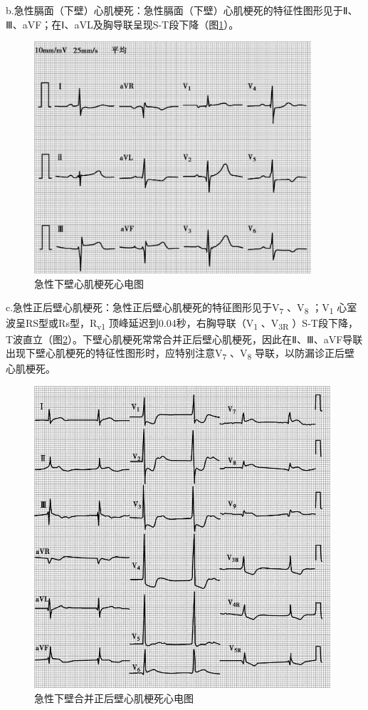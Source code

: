 b.急性膈面（下壁）心肌梗死：急性膈面（下壁）心肌梗死的特征性图形见于Ⅱ、Ⅲ、aVF；在Ⅰ、aVL及胸导联呈现S-T段下降（图\ref{fig10-3}）。

\begin{figure}[!htbp]
 \centering
 \includegraphics[width=4.05208in,height=3.39583in]{./images/Image00074.jpg}
 \captionsetup{justification=centering}
 \caption{急性下壁心肌梗死心电图}
 \label{fig10-3}
  \end{figure} 

c.急性正后壁心肌梗死：急性正后壁心肌梗死的特征图形见于V\textsubscript{7}
、V\textsubscript{8} ；V\textsubscript{1}
心室波呈RS型或Rs型，R\textsubscript{v1}
顶峰延迟到0.04秒，右胸导联（V\textsubscript{1} 、V\textsubscript{3R}
）S-T段下降，T波直立（图\ref{fig10-4}）。下壁心肌梗死常常合并正后壁心肌梗死，因此在Ⅱ、Ⅲ、aVF导联出现下壁心肌梗死的特征性图形时，应特别注意V\textsubscript{7}
、V\textsubscript{8} 导联，以防漏诊正后壁心肌梗死。

\begin{figure}[!htbp]
 \centering
 \includegraphics[width=4.33333in,height=4.41667in]{./images/Image00075.jpg}
 \captionsetup{justification=centering}
 \caption{急性下壁合并正后壁心肌梗死心电图}
 \label{fig10-4}
  \end{figure} 

